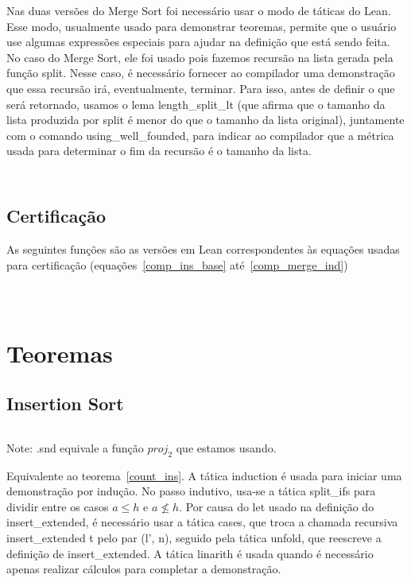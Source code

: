 \documentclass[12pt, oneside, a4paper,english,brazil]{abntex2}
\begin{document}
Nas duas vers\~oes do Merge Sort foi necess\'ario usar o modo de t\'aticas do Lean.
Esse modo, usualmente usado para demonstrar teoremas, permite que o usu\'ario use
algumas express\~oes especiais para ajudar na defini\c{c}\~ao que est\'a sendo
feita. No caso do Merge Sort, ele foi usado pois fazemos recurs\~ao na lista gerada
pela fun\c{c}\~ao split. Nesse caso, \'e necess\'ario fornecer ao compilador uma
demonstra\c{c}\~ao que essa recurs\~ao ir\'a, eventualmente, terminar. Para isso,
antes de definir o que ser\'a retornado, usamos o lema \textsf{length\_split\_lt} (que afirma que o tamanho da lista produzida por \textsf{split} \'e menor do que o tamanho da lista original), juntamente com o comando \textsf{using\_well\_founded}, para indicar ao compilador que a m\'etrica usada para determinar o fim da recurs\~ao \'e o tamanho da lista.

\inputminted{lean}{merge_sort.lean}
\inputminted{lean}{merge_sort_modified.lean}

\subsection{Certifica\c{c}\~ao}

As seguintes fun\c{c}\~oes s\~ao as vers\~oes em Lean correspondentes \`as
equa\c{c}\~oes usadas para certifica\c{c}\~ao (equa\c{c}\~oes~\ref{comp_ins_base} at\'e~\ref{comp_merge_ind})

\inputminted{lean}{ins_comp.lean}
\inputminted{lean}{remove_pref.lean}
\inputminted{lean}{merge_comp.lean}

\section{Teoremas}

\subsection{Insertion Sort}

\inputminted{lean}{ins_complexity.lean}

Note: \textsf{.snd} equivale a fun\c{c}\~ao $proj_{2}$ que estamos usando.

Equivalente ao teorema~\ref{count_ins}. A t\'atica \textsf{induction} \'e usada
 para iniciar uma demonstra\c{c}\~ao por indu\c{c}\~ao. No passo indutivo,
usa-se a t\'atica
\textsf{split\_ifs} para dividir entre os casos \textsf{$a \le h$} e \textsf{$a
\not \le h$}. Por causa do \textsf{let} usado na defini\c{c}\~ao do
\textsf{insert\_extended}, \'e necess\'ario usar a t\'atica \textsf{cases},
que troca a chamada recursiva \textsf{insert\_extended t} pelo par \textsf{(l',
  n)}, seguido pela t\'atica \textsf{unfold}, que reescreve a defini\c{c}\~ao de
\textsf{insert\_extended}. A t\'atica \textsf{linarith} \'e usada quando \'e necess\'ario apenas realizar c\'alculos para completar a demonstra\c{c}\~ao.
\end{document}
